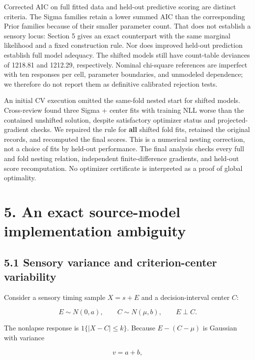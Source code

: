\documentclass[
  11pt,
]{article}
\let\ctdoldsection\section
\renewcommand{\section}{\Needspace{8\baselineskip}\ctdoldsection}
\let\ctdoldsubsection\subsection
\renewcommand{\subsection}{\Needspace{6\baselineskip}\ctdoldsubsection}
\begin{document}
Corrected AIC on full fitted data and held-out predictive scoring are
distinct criteria. The Sigma families retain a lower summed AIC than the
corresponding Prior families because of their smaller parameter count.
That does not establish a sensory locus: Section 5 gives an exact
counterpart with the same marginal likelihood and a fixed construction
rule. Nor does improved held-out prediction establish full model
adequacy. The shifted models still have count-table deviances of 1218.81
and 1212.29, respectively. Nominal chi-square references are imperfect
with ten responses per cell, parameter boundaries, and unmodeled
dependence; we therefore do not report them as definitive calibrated
rejection tests.

An initial CV execution omitted the same-fold nested start for shifted
models. Cross-review found three Sigma + center fits with training NLL
worse than the contained unshifted solution, despite satisfactory
optimizer status and projected-gradient checks. We repaired the rule for
\textbf{all} shifted fold fits, retained the original records, and
recomputed the final scores. This is a numerical nesting correction, not
a choice of fits by held-out performance. The final analysis checks
every full and fold nesting relation, independent finite-difference
gradients, and held-out score recomputation. No optimizer certificate is
interpreted as a proof of global optimality.

\hypertarget{an-exact-source-model-implementation-ambiguity}{%
\section{5. An exact source-model implementation
ambiguity}\label{an-exact-source-model-implementation-ambiguity}}

\hypertarget{sensory-variance-and-criterion-center-variability}{%
\subsection{5.1 Sensory variance and criterion-center
variability}\label{sensory-variance-and-criterion-center-variability}}

Consider a sensory timing sample \(X=s+E\) and a decision-interval
center \(C\):

\[
E\sim N(0,a),\qquad C\sim N(\mu,b),\qquad E\perp C.
\]

The nonlapse response is \(1\{|X-C|\leq k\}\). Because \(E-(C-\mu)\) is
Gaussian with variance

\[
v=a+b,
\tag{8}
\]
\end{document}
